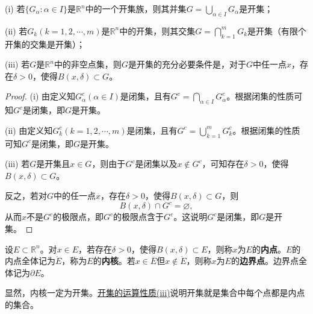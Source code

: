 \documentclass[lang=cn,newtx,10pt,scheme=chinese]{../Template/elegantbook}
\begin{document}
\begin{theorem}[开集的运算性质]\label{theorem:开集的运算性质}
(i) 若\(\{G_{\alpha}:\alpha\in I\}\)是\(\mathbb{R}^n\)中的一个开集族，则其并集\(G = \bigcup_{\alpha\in I}G_{\alpha}\)是开集；

(ii) 若\(G_k(k = 1,2,\cdots,m)\)是\(\mathbb{R}^n\)中的开集，则其交集\(G=\bigcap_{k = 1}^{m}G_k\)是开集（有限个开集的交集是开集）；

(iii) 若\(G\)是\(\mathbb{R}^n\)中的非空点集，则\(G\)是开集的充分必要条件是，对于\(G\)中任一点\(x\)，存在\(\delta>0\)，使得\(B(x,\delta)\subset G\)。
\end{theorem}
\begin{proof}
  (i) 由定义知\(G_{\alpha}^c(\alpha\in I)\)是闭集，且有\(G^c=\bigcap_{\alpha\in I}G_{\alpha}^c\)。根据闭集的性质可知\(G^c\)是闭集，即\(G\)是开集。

(ii) 由定义知\(G_k^c(k = 1,2,\cdots,m)\)是闭集，且有\(G^c=\bigcup_{k = 1}^{m}G_k^c\)。根据闭集的性质可知\(G^c\)是闭集，即\(G\)是开集。

(iii) 若\(G\)是开集且\(x\in G\)，则由于\(G^c\)是闭集以及\(x\notin G^c\)，可知存在\(\delta>0\)，使得\(B(x,\delta)\subset G\)。

反之，若对\(G\)中的任一点\(x\)，存在\(\delta>0\)，使得\(B(x,\delta)\subset G\)，则
\[B(x,\delta)\cap G^c=\varnothing,\]
从而\(x\)不是\(G^c\)的极限点，即\(G^c\)的极限点含于\(G^c\)。这说明\(G^c\)是闭集，即\(G\)是开集。

\end{proof}

\begin{definition}[内点与边界点]\label{definition:内点与边界点}
  设\(E\subset\mathbb{R}^n\)。对\(x\in E\)，若存在\(\delta>0\)，使得\(B(x,\delta)\subset E\)，则称\(x\)为\(E\)的\textbf{内点}。\(E\)的内点全体记为\(\mathring{E}\)，称为\(E\)的\textbf{内核}。若\(x\in\overline{E}\)但\(x\notin\mathring{E}\)，则称\(x\)为\(E\)的\textbf{边界点}。边界点全体记为\(\partial E\)。
\end{definition}
\begin{note}
  显然，内核一定为开集。\hyperref[theorem:开集的运算性质]{开集的运算性质(iii)}说明开集就是集合中每个点都是内点的集合。
\end{note}
\end{document}
